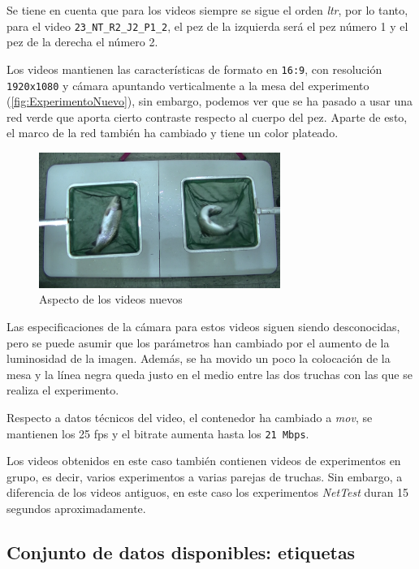Se tiene en cuenta que para los videos siempre se sigue el orden \textit{\acrfull{ltr}}, por lo tanto, para el video \verb|23_NT_R2_J2_P1_2|, el pez de la izquierda será el pez número 1 y 
el pez de la derecha el número 2.

Los videos mantienen las características de formato en \texttt{16:9}, con resolución \texttt{1920x1080} y cámara apuntando verticalmente a la mesa del experimento 
(\autoref{fig:ExperimentoNuevo}), sin embargo, podemos ver que se ha pasado a usar una red verde que aporta cierto contraste respecto al cuerpo del pez. Aparte de esto, 
el marco de la red también ha cambiado y tiene un color plateado.

\begin{figure}[H]
    \centering
    \includegraphics[width=0.7\textwidth]{images/3/ExperimentoNuevo.png}
    \caption{Aspecto de los videos nuevos}
    \label{fig:ExperimentoNuevo}
\end{figure}

Las especificaciones de la cámara para estos videos siguen siendo desconocidas, pero se puede asumir que los parámetros han cambiado por el aumento de la luminosidad de la imagen.
Además, se ha movido un poco la colocación de la mesa y la línea negra queda justo en el medio entre las dos truchas con las que se realiza el experimento.

Respecto a datos técnicos del video, el contenedor ha cambiado a \textit{\acrfull{mov}}, se mantienen los 25 \acrshort{fps} y el bitrate aumenta hasta los \texttt{21 Mbps}.

Los videos obtenidos en este caso también contienen videos de experimentos en grupo, es decir, varios experimentos a varias parejas de truchas. Sin embargo, a diferencia de los videos antiguos, 
en este caso los experimentos \textit{NetTest} duran 15 segundos aproximadamente.

\subsection{Conjunto de datos disponibles: etiquetas}

